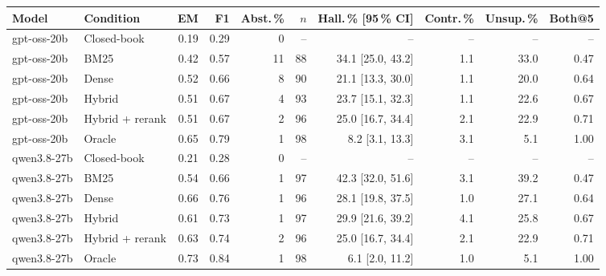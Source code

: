 \begin{tabular}{@{}llrrrrrrrr@{}}
\toprule
Model & Condition & EM & F1 & Abst.\,\% & $n$ & Hall.\,\% [95\,\% CI] & Contr.\,\% & Unsup.\,\% & Both@5 \\
\midrule
gpt-oss-20b & Closed-book & 0.19 & 0.29 & 0 & -- & -- & -- & -- & -- \\
gpt-oss-20b & BM25 & 0.42 & 0.57 & 11 & 88 & 34.1 [25.0, 43.2] & 1.1 & 33.0 & 0.47 \\
gpt-oss-20b & Dense & 0.52 & 0.66 & 8 & 90 & 21.1 [13.3, 30.0] & 1.1 & 20.0 & 0.64 \\
gpt-oss-20b & Hybrid & 0.51 & 0.67 & 4 & 93 & 23.7 [15.1, 32.3] & 1.1 & 22.6 & 0.67 \\
gpt-oss-20b & Hybrid + rerank & 0.51 & 0.67 & 2 & 96 & 25.0 [16.7, 34.4] & 2.1 & 22.9 & 0.71 \\
gpt-oss-20b & Oracle & 0.65 & 0.79 & 1 & 98 & 8.2 [3.1, 13.3] & 3.1 & 5.1 & 1.00 \\
\midrule
qwen3.8-27b & Closed-book & 0.21 & 0.28 & 0 & -- & -- & -- & -- & -- \\
qwen3.8-27b & BM25 & 0.54 & 0.66 & 1 & 97 & 42.3 [32.0, 51.6] & 3.1 & 39.2 & 0.47 \\
qwen3.8-27b & Dense & 0.66 & 0.76 & 1 & 96 & 28.1 [19.8, 37.5] & 1.0 & 27.1 & 0.64 \\
qwen3.8-27b & Hybrid & 0.61 & 0.73 & 1 & 97 & 29.9 [21.6, 39.2] & 4.1 & 25.8 & 0.67 \\
qwen3.8-27b & Hybrid + rerank & 0.63 & 0.74 & 2 & 96 & 25.0 [16.7, 34.4] & 2.1 & 22.9 & 0.71 \\
qwen3.8-27b & Oracle & 0.73 & 0.84 & 1 & 98 & 6.1 [2.0, 11.2] & 1.0 & 5.1 & 1.00 \\
\bottomrule
\end{tabular}
